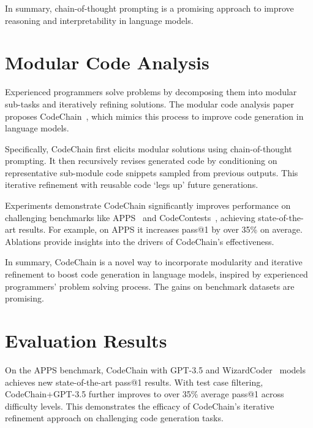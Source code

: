 \documentclass[a4paper,oneside]{book}
\begin{document}
In summary, chain-of-thought prompting is a promising approach to improve reasoning and interpretability in language models.

\section{Modular Code Analysis}
Experienced programmers solve problems by decomposing them into modular sub-tasks and iteratively refining solutions. The modular code analysis paper proposes CodeChain~\cite{le2023codechain}, which mimics this process to improve code generation in language models.

Specifically, CodeChain first elicits modular solutions using chain-of-thought prompting. It then recursively revises generated code by conditioning on representative sub-module code snippets sampled from previous outputs. This iterative refinement with reusable code `legs up' future generations.

Experiments demonstrate CodeChain significantly improves performance on challenging benchmarks like APPS~\cite{hendrycks2021measuring} and CodeContests~\cite{Li_2022}, achieving state-of-the-art results. For example, on APPS it increases pass@1 by over 35\% on average. Ablations provide insights into the drivers of CodeChain's effectiveness.

In summary, CodeChain is a novel way to incorporate modularity and iterative refinement to boost code generation in language models, inspired by experienced programmers' problem solving process. The gains on benchmark datasets are promising.

\section{Evaluation Results}
On the APPS benchmark, CodeChain with GPT-3.5 and WizardCoder~\cite{luo2023wizardcoder} models achieves new state-of-the-art pass@1 results. With test case filtering, CodeChain+GPT-3.5 further improves to over 35\% average pass@1 across difficulty levels. This demonstrates the efficacy of CodeChain's iterative refinement approach on challenging code generation tasks.
\end{document}
